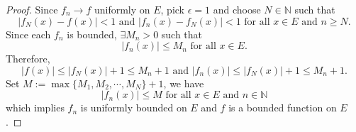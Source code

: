 \begin{Exercise}
\begin{proof}
Since $f_n\to f$ uniformly on $E$, pick $\epsilon = 1$ and choose $N\in\mathbb{N}$ such that $$ \left| f_N(x)-f(x) \right|<1\text{ and } \left| f_n(x)-f_N(x) \right|<1 \mbox{ for all } x\in E\text{ and } n\geq N.$$
Since each $f_n$ is bounded, $\exists M_n>0$ such that $$\left|f_n(x)\right|\leq M_n \mbox{ for all } x\in E.$$
Therefore, $$\left| f(x) \right| \leq \left| f_N(x) \right| +1\leq M_n+1\text{ and } \left|f_n(x)\right| \leq \left|f_N(x)\right|+1\leq M_n+1.$$
Set $M := \max\{M_1, M_2, \cdots, M_N\}+1$, we have $$\left| f_n(x) \right| \leq M\mbox{ for all } x\in E\text{ and } n\in\mathbb{N}$$
which implies ${f_n}$ is uniformly bounded on $E$ and $f$ is a bounded function on $E$.
\end{proof}
\end{Exercise}